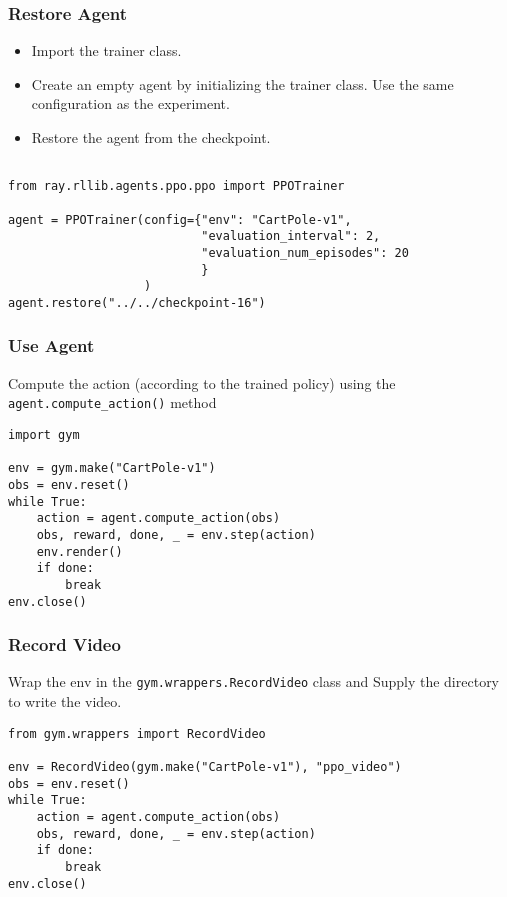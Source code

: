 \begin{frame}[fragile]\frametitle{Restore Agent}

\begin{itemize}
\item Import the trainer class.
\item Create an empty agent by initializing the trainer class. Use the same configuration as the experiment.
\item Restore the agent from the checkpoint.
\end{itemize}



\begin{lstlisting}

from ray.rllib.agents.ppo.ppo import PPOTrainer

agent = PPOTrainer(config={"env": "CartPole-v1",
                           "evaluation_interval": 2,
                           "evaluation_num_episodes": 20
                           }
                   )
agent.restore("../../checkpoint-16")
\end{lstlisting}

\end{frame}

\begin{frame}[fragile]\frametitle{Use Agent}

Compute the action (according to the trained policy) using the \lstinline|agent.compute_action()| method

\begin{lstlisting}
import gym

env = gym.make("CartPole-v1")
obs = env.reset()
while True:
    action = agent.compute_action(obs)
    obs, reward, done, _ = env.step(action)
    env.render()
    if done:
        break
env.close()
\end{lstlisting}

\end{frame}

\begin{frame}[fragile]\frametitle{Record Video}

Wrap the env in the \lstinline|gym.wrappers.RecordVideo| class and Supply the directory to write the video.

\begin{lstlisting}
from gym.wrappers import RecordVideo

env = RecordVideo(gym.make("CartPole-v1"), "ppo_video")
obs = env.reset()
while True:
    action = agent.compute_action(obs)
    obs, reward, done, _ = env.step(action)
    if done:
        break
env.close()
\end{lstlisting}

\end{frame}